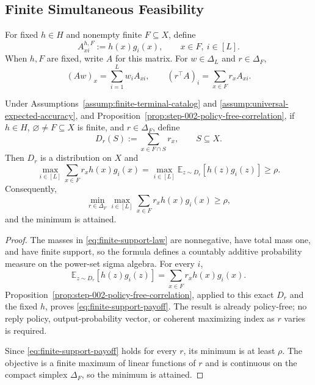 \subsection{Finite Simultaneous Feasibility}
\label{app:finite-simultaneous-feasibility}

For fixed $h\in H$ and nonempty finite $F\subseteq X$, define
\begin{equation}\label{eq:finite-payoff-matrix}
A^{h,F}_{xi}:=h(x)g_i(x),\qquad x\in F,\ i\in[L].
\end{equation}
When $h,F$ are fixed, write $A$ for this matrix.  For
$w\in\Delta_L$ and $r\in\Delta_F$,
\[
(Aw)_x=\sum_{i=1}^Lw_iA_{xi},\qquad
(r^\top A)_i=\sum_{x\in F}r_xA_{xi}.
\]

\begin{lemma}
\label{lem:step-003-finite-support-payoff}
Under Assumptions~\ref{assump:finite-terminal-catalog} and
\ref{assump:universal-expected-accuracy}, and
Proposition~\ref{prop:step-002-policy-free-correlation}, if $h\in H$,
$\varnothing\ne F\subseteq X$ is finite, and $r\in\Delta_F$, define
\begin{equation}\label{eq:finite-support-law}
D_r(S):=\sum_{x\in F\cap S}r_x,\qquad S\subseteq X.
\end{equation}
Then $D_r$ is a distribution on $X$ and
\begin{equation}\label{eq:finite-support-payoff}
\max_{i\in[L]}\sum_{x\in F}r_xh(x)g_i(x)
=\max_{i\in[L]}\mathbb E_{z\sim D_r}[h(z)g_i(z)]
\ge\rho.
\end{equation}
Consequently,
\begin{equation}\label{eq:finite-row-value}
\min_{r\in\Delta_F}\max_{i\in[L]}
\sum_{x\in F}r_xh(x)g_i(x)\ge\rho,
\end{equation}
and the minimum is attained.
\end{lemma}

\begin{proof}
The masses in \eqref{eq:finite-support-law} are nonnegative, have total mass
one, and have finite support, so the formula defines a countably additive
probability measure on the power-set sigma algebra.  For every $i$,
\[
\mathbb E_{z\sim D_r}[h(z)g_i(z)]
=\sum_{x\in F}r_xh(x)g_i(x).
\]
Proposition~\ref{prop:step-002-policy-free-correlation}, applied to this exact
$D_r$ and the fixed $h$, proves \eqref{eq:finite-support-payoff}.  The result
is already policy-free; no reply policy, output-probability vector, or
coherent maximizing index as $r$ varies is required.

Since \eqref{eq:finite-support-payoff} holds for every $r$, its minimum is at
least $\rho$.  The objective is a finite maximum of linear functions of $r$
and is continuous on the compact simplex $\Delta_F$, so the minimum is
attained.
\end{proof}

